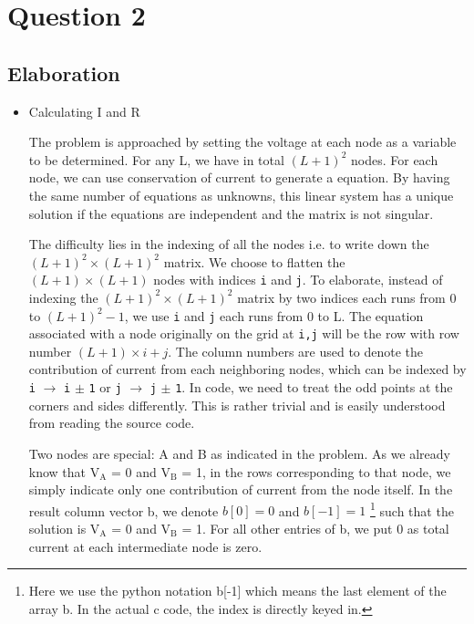 \documentclass{article}
\begin{document}
\section{Question 2}
\label{sec-2}

\subsection{Elaboration}
\label{sec-2-1}

\begin{itemize}
\item Calculating I and R

The problem is approached by setting the voltage at each node as a
variable to be determined. For any L, we have in total $(L + 1)^2$
nodes. For each node, we can use conservation of current to
generate a equation. By having the same number of equations as
unknowns, this linear system has a unique solution if the equations
are independent and the matrix is not singular.

The difficulty lies in the indexing of all the nodes i.e. to write
down the $(L+1)^2 \times (L+1)^2$ matrix. We choose to flatten the
$(L+1) \times (L+1)$ nodes with indices \texttt{i} and \texttt{j}. To elaborate,
instead of indexing the $(L+1)^2 \times (L+1)^2$ matrix by two
indices each runs from 0 to $(L+1)^2 - 1$, we use \texttt{i} and \texttt{j} each runs
from 0 to L. The equation associated with a node originally on the
grid at \texttt{i,j} will be the row with row number $(L+1) \times i + j$. The
column numbers are used to denote the contribution of current from
each neighboring nodes, which can be indexed by \texttt{i} $\to$ \texttt{i} $\pm$ \texttt{1} or
\texttt{j} $\to$ \texttt{j} $\pm$ \texttt{1}. In code, we need to treat the odd points at the
corners and sides differently. This is rather trivial and is easily
understood from reading the source code.

 Two nodes are special: A and B as indicated in the problem. As we
already know that V$_{\text{A}}$ = 0 and V$_{\text{B}}$ = 1, in the rows corresponding to
that node, we simply indicate only one contribution of current from
the node itself. In the result column vector b, we denote $b[0] = 0$
and $b[-1] = 1$ \footnote{Here we use the python notation b[-1] which means the last
element of the array b. In the actual c code, the index is directly keyed in.} such that the solution is V$_{\text{A}}$ = 0 and V$_{\text{B}}$
= 1. For all other entries of b, we put 0 as total current at each
intermediate node is zero.


\end{itemize}
\end{document}
